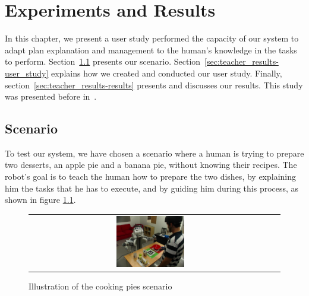 \chapter{Experiments and Results} %



\label{chapter:teacher_results} %

In this chapter, we present a user study performed the capacity of our system to adapt plan explanation and management to the human's knowledge in the tasks to perform. Section~\ref{sec:teacher_results-scenario} presents our scenario. Section~\ref{sec:teacher_results-user_study} explains how we created and conducted our user study. Finally, section~\ref{sec:teacher_results-results} presents and discusses our results. This study was presented before in~\cite{milliez2016using}.



 \section{Scenario}
\label{sec:teacher_results-scenario}
To test our system, we have chosen a scenario where a human is trying to prepare two desserts, an apple pie and a banana pie, without knowing their recipes. The robot's goal is to teach the human how to prepare the two dishes, by explaining him the tasks that he has to execute, and by guiding him during this process, as shown in figure \ref{fig:teacher_results-scenario}. 

\begin{figure}[ht!]

 \centering
 \begin{tabular}{cc}
  \includegraphics[width=0.29\textwidth]{img/teacher/scenario.JPG}
 \end{tabular}
 \caption{Illustration of the cooking pies scenario}
 \label{fig:teacher_results-scenario}
 \end{figure}

